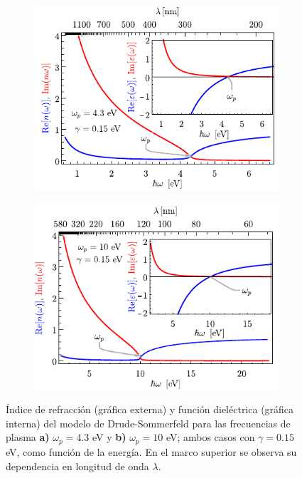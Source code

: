 	\begin{figure}[h!]\centering\hspace*{-1.5em}
	\begin{subfigure}{.01\linewidth}\caption{}\label{sfig:Drude4eV}\vspace{3.75cm}\end{subfigure}
	\begin{subfigure}{.45\linewidth}\hspace*{-1.3em}
	\includegraphics[scale=1]{1-Teoria/figs/1-4-varepsn4eV.pdf}
	\end{subfigure}
	\begin{subfigure}{.01\linewidth}\caption{}\label{sfig:Drude10eV}\vspace{3.75cm}\end{subfigure}
	\begin{subfigure}{.45\linewidth}\hspace*{-1em}
	\includegraphics[scale=1 ]{1-Teoria/figs/1-4-varepsn10eV.pdf}
	\end{subfigure}\vspace*{-.7em}
	\caption{ Índice de refracción (gráfica externa) y función dieléctrica (gráfica interna) del modelo de Drude-Sommerfeld para las frecuencias de plasma \textbf{a)} $\omega_p=4. 3$ eV y \textbf{b)} $\omega_p=10$ eV; ambos casos con $\gamma=0. 15$ eV, como función de la energía.  En el marco superior se observa su dependencia en longitud de onda $\lambda$. }\label{fig:Drude}
	\end{figure}	

